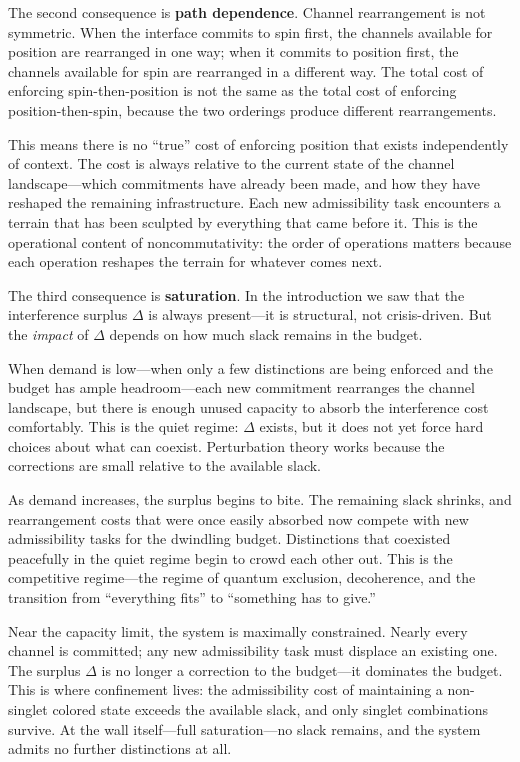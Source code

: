 \documentclass[11pt]{article}
\begin{document}
The second consequence is \textbf{path dependence}.  Channel rearrangement is not symmetric.  When the interface commits to spin first, the channels available for position are rearranged in one way; when it commits to position first, the channels available for spin are rearranged in a different way.  The total cost of enforcing spin-then-position is not the same as the total cost of enforcing position-then-spin, because the two orderings produce different rearrangements.

This means there is no ``true'' cost of enforcing position that exists independently of context.  The cost is always relative to the current state of the channel landscape---which commitments have already been made, and how they have reshaped the remaining infrastructure.  Each new admissibility task encounters a terrain that has been sculpted by everything that came before it.  This is the operational content of noncommutativity: the order of operations matters because each operation reshapes the terrain for whatever comes next.

The third consequence is \textbf{saturation}.  In the introduction we saw that the interference surplus $\Delta$ is always present---it is structural, not crisis-driven.  But the \emph{impact} of $\Delta$ depends on how much slack remains in the budget.

When demand is low---when only a few distinctions are being enforced and the budget has ample headroom---each new commitment rearranges the channel landscape, but there is enough unused capacity to absorb the interference cost comfortably.  This is the quiet regime: $\Delta$ exists, but it does not yet force hard choices about what can coexist.  Perturbation theory works because the corrections are small relative to the available slack.

As demand increases, the surplus begins to bite.  The remaining slack shrinks, and rearrangement costs that were once easily absorbed now compete with new admissibility tasks for the dwindling budget.  Distinctions that coexisted peacefully in the quiet regime begin to crowd each other out.  This is the competitive regime---the regime of quantum exclusion, decoherence, and the transition from ``everything fits'' to ``something has to give.''

Near the capacity limit, the system is maximally constrained.  Nearly every channel is committed; any new admissibility task must displace an existing one.  The surplus $\Delta$ is no longer a correction to the budget---it dominates the budget.  This is where confinement lives: the admissibility cost of maintaining a non-singlet colored state exceeds the available slack, and only singlet combinations survive.  At the wall itself---full saturation---no slack remains, and the system admits no further distinctions at all.
\end{document}
